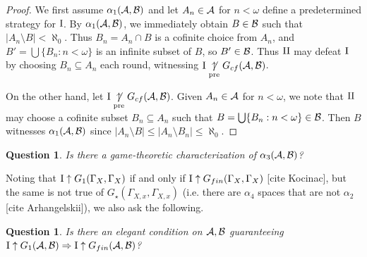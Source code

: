 \documentclass{amsart}
\theoremstyle{plain}
\newtheorem{question}[theorem]{Question}
\theoremstyle{definition}
\theoremstyle{remark}
\theoremstyle{plain}
\theoremstyle{definition}
\theoremstyle{remark}
\begin{document}
\begin{proof}
We first assume \(\alpha_1(\mathcal{A},\mathcal{B})\) and let \(A_n\in\mathcal{A}\) for \(n<\omega\)
define a predetermined strategy for \(\mathrm{I}\). By \(\alpha_1(\mathcal{A},\mathcal{B})\), we
immediately obtain \(B\in\mathcal{B}\) such that \(|A_n\setminus B|<\aleph_0\). Thus
\(B_n=A_n\cap B\) is a cofinite choice from \(A_n\), and 
\(B'=\bigcup\{B_n:n<\omega\}\) is an infinite subset of \(B\),
so \(B'\in\mathcal{B}\). Thus \(\mathrm{II}\) may defeat \(\mathrm{I}\) by choosing
\(B_n\subseteq A_n\) each round, witnessing \(\mathrm{I}\underset{\text{pre}}{\not\uparrow} G_{cf}(\mathcal{A},\mathcal{B})\).

On the other hand, let \(\mathrm{I}\underset{\text{pre}}{\not\uparrow} G_{cf}(\mathcal{A},\mathcal{B})\). Given \(A_n\in\mathcal{A}\)
for \(n<\omega\), we note that \(\mathrm{II}\) may choose a cofinite subset \(B_n\subseteq A_n\)
such that \(B=\bigcup\{B_n:n<\omega\}\in\mathcal{B}\). Then \(B\) witnesses \(\alpha_1(\mathcal{A},\mathcal{B})\)
since \(|A_n\setminus B|\leq|A_n\setminus B_n|\leq\aleph_0\).
\end{proof}

\begin{question}
Is there a game-theoretic characterization of \(\alpha_3(\mathcal{A},\mathcal{B})\)?
\end{question}

Noting that \(\mathrm{I}\uparrow G_1(\Gamma_X,\Gamma_X)\) if and only if
\(\mathrm{I}\uparrow G_{fin}(\Gamma_X,\Gamma_X)\) [cite Kocinac], but
the same is not true of \(G_\star(\Gamma_{X,x},\Gamma_{X,x})\)
(i.e. there are \(\alpha_4\) spaces that are not \(\alpha_2\)
[cite Arhangelskii]),
we also ask the following.

\begin{question}
Is there an elegant condition on \(\mathcal{A},\mathcal{B}\) guaranteeing
\(\mathrm{I}\uparrow G_1(\mathcal{A},\mathcal{B})\Rightarrow\mathrm{I}\uparrow G_{fin}(\mathcal{A},\mathcal{B})\)?
\end{question}



\end{document}
